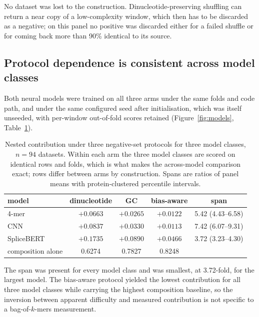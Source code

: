 No dataset was lost to the construction. Dinucleotide-preserving shuffling can return a near
copy of a low-complexity window, which then has to be discarded as a negative; on this panel no
positive was discarded either for a failed shuffle or for coming back more than 90\% identical
to its source.

\subsection{Protocol dependence is consistent across model classes}
\label{sec:models}

Both neural models were trained on all three arms under the same folds and code path, and
under the same configured seed after initialisation, which was itself unseeded,
with per-window out-of-fold scores retained (Figure~\ref{fig:models},
Table~\ref{tab:threemodels}).

\begin{table}[htbp]
\centering
\caption{Nested contribution under three negative-set protocols for three model classes,
$n=94$ datasets. Within each arm the three model classes are scored on identical rows and
folds, which is what makes the across-model comparison exact; rows differ between arms by
construction. Spans are ratios of panel means with protein-clustered percentile intervals.}
\label{tab:threemodels}
\begin{tabular}{lcccc}
\toprule
model & dinucleotide & GC & bias-aware & span \\
\midrule
4-mer & $+0.0663$ & $+0.0265$ & $+0.0122$ & 5.42 (4.43--6.58) \\
CNN & $+0.0837$ & $+0.0330$ & $+0.0113$ & 7.42 (6.07--9.31) \\
SpliceBERT & $+0.1735$ & $+0.0890$ & $+0.0466$ & 3.72 (3.23--4.30) \\
\midrule
composition alone & 0.6274 & 0.7827 & 0.8248 & \\
\bottomrule
\end{tabular}
\end{table}

The span was present for every model class and was smallest, at 3.72-fold, for the largest
model. The bias-aware protocol yielded the lowest contribution for all three model classes while
carrying the highest composition baseline, so the inversion between apparent difficulty and
measured contribution is not specific to a bag-of-$k$-mers measurement.

